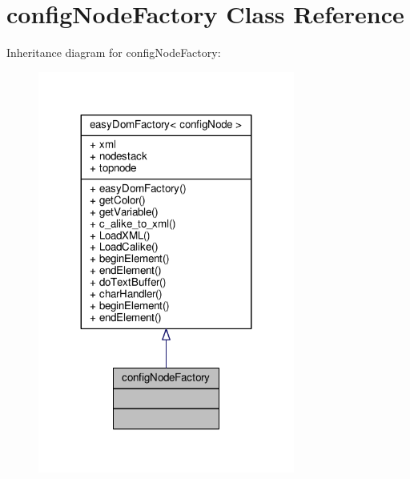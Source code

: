 \hypertarget{classconfigNodeFactory}{}\section{config\+Node\+Factory Class Reference}
\label{classconfigNodeFactory}


Inheritance diagram for config\+Node\+Factory\+:
\nopagebreak
\begin{figure}[H]
\begin{center}
\leavevmode
\includegraphics[width=239pt]{dd/d1b/classconfigNodeFactory__inherit__graph}
\end{center}
\end{figure}


